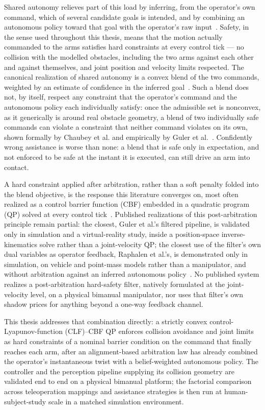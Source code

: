 Shared autonomy relieves part of this load by inferring, from the operator's own command, which of several candidate goals is intended, and by combining an autonomous policy toward that goal with the operator's raw input~\cite{selvaggio2021autonomy,losey2018review}. Safety, in the sense used throughout this thesis, means that the motion actually commanded to the arms satisfies hard constraints at every control tick --- no collision with the modelled obstacles, including the two arms against each other and against themselves, and joint position and velocity limits respected. The canonical realization of shared autonomy is a convex blend of the two commands, weighted by an estimate of confidence in the inferred goal~\cite{dragan2013policy}. Such a blend does not, by itself, respect any constraint that the operator's command and the autonomous policy each individually satisfy: once the admissible set is nonconvex, as it generically is around real obstacle geometry, a blend of two individually safe commands can violate a constraint that neither command violates on its own, shown formally by Chaubey et al. and empirically by Guler et al.~\cite{chaubey2026minimalintervention,guler2026barrierik}. Confidently wrong assistance is worse than none: a blend that is safe only in expectation, and not enforced to be safe at the instant it is executed, can still drive an arm into contact.

A hard constraint applied after arbitration, rather than a soft penalty folded into the blend objective, is the response this literature converges on, most often realized as a control barrier function (CBF) embedded in a quadratic program (QP) solved at every control tick~\cite{ames2017cbf}. Published realizations of this post-arbitration principle remain partial: the closest, Guler et al.'s filtered pipeline, is validated only in simulation and a virtual-reality study, inside a position-space inverse-kinematics solve rather than a joint-velocity QP; the closest use of the filter's own dual variables as operator feedback, Raphalen et al.'s, is demonstrated only in simulation, on vehicle and point-mass models rather than a manipulator, and without arbitration against an inferred autonomous policy~\cite{raphalen2026feeling}. No published system realizes a post-arbitration hard-safety filter, natively formulated at the joint-velocity level, on a physical bimanual manipulator, nor uses that filter's own shadow prices for anything beyond a one-way feedback channel.

This thesis addresses that combination directly: a strictly convex control-Lyapunov-function (CLF)--CBF QP enforces collision avoidance and joint limits as hard constraints of a nominal barrier condition on the command that finally reaches each arm, after an alignment-based arbitration law has already combined the operator's instantaneous twist with a belief-weighted autonomous policy. The controller and the perception pipeline supplying its collision geometry are validated end to end on a physical bimanual platform; the factorial comparison across teleoperation mappings and assistance strategies is then run at human-subject-study scale in a matched simulation environment.


